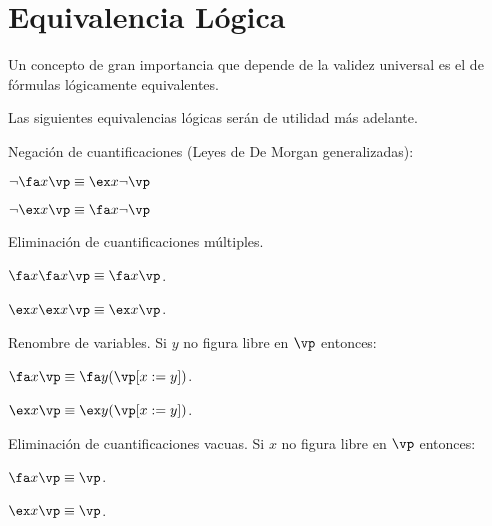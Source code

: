 \documentclass[11pt,letterpaper]{article}
\begin{document}


\section{Equivalencia Lógica}

Un concepto de gran importancia que depende de la validez universal es el
de f\'ormulas l\'ogicamente equivalentes.


Las siguientes equivalencias l\'ogicas ser\'an
de utilidad m\'as adelante.
\be
\item Negación de cuantificaciones (Leyes de De Morgan generalizadas):
  \be
\item $\neg\fa x \vp\equiv\ex x\neg \vp$
\item $\neg\ex x \vp\equiv\fa x\neg \vp$
  \ee
\item Eliminaci\'on de cuantificaciones m\'ultiples. 
\be
\item$\fa x\fa x\vp\equiv\fa x\vp$.
\item $\ex x\ex x\vp\equiv\ex x\vp$.
\ee
\item Renombre de variables. Si $y$ no figura libre en $\vp$
entonces:
\be
\item $\fa x\vp\equiv\fa y(\vp[x:=y])$.
\item $\ex x\vp\equiv\ex y(\vp[x:=y])$.
\ee
\item Eliminaci\'on de cuantificaciones vacuas. Si $x$ no figura libre en
$\vp$ entonces:
\be
\item $\fa x\vp\equiv\vp$.
\item $\ex x\vp\equiv\vp$.
\ee
\ee
\end{document}
